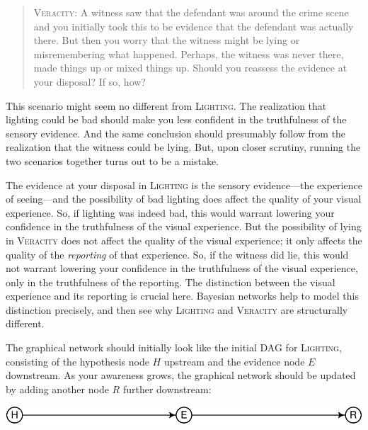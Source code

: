 \documentclass[
  11pt,
  dvipsnames,enabledeprecatedfontcommands, todos]{scrartcl}
\begin{document}
\begin{quote}
\textsc{Veracity}: A witness saw that the defendant was around the crime
scene and you initially took this to be evidence that the defendant was
actually there. But then you worry that the witness might be lying or
misremembering what happened. Perhaps, the witness was never there, made
things up or mixed things up. Should you reassess the evidence at your
disposal? If so, how?
\end{quote}

\doublespace

\noindent   This scenario might seem no different from
\textsc{Lighting}. The realization that lighting could be bad should
make you less confident in the truthfulness of the sensory evidence. And
the same conclusion should presumably follow from the realization that
the witness could be lying. But, upon closer scrutiny, running the two
scenarios together turns out to be a mistake.

The evidence at your disposal in \textsc{Lighting} is the sensory
evidence---the experience of seeing---and the possibility of bad
lighting does affect the quality of your visual experience. So, if
lighting was indeed bad, this would warrant lowering your confidence in
the truthfulness of the visual experience. But the possibility of lying
in \textsc{Veracity} does not affect the quality of the visual
experience; it only affects the quality of the \textit{reporting} of
that experience. So, if the witness did lie, this would not warrant
lowering your confidence in the truthfulness of the visual experience,
only in the truthfulness of the reporting. The distinction between the
visual experience and its reporting is crucial here. Bayesian networks
help to model this distinction precisely, and then see why
\textsc{Lighting} and \textsc{Veracity} are structurally different.

The graphical network should initially look like the initial DAG for
\textsc{Lighting}, consisting of the hypothesis node \(H\) upstream and
the evidence node \(E\) downstream. As your awareness grows, the
graphical network should be updated by adding another node \(R\) further
downstream:

\begin{center}\includegraphics[width=0.5\linewidth,height=0.3\textheight]{ReplyToSteeleStefansson5_files/figure-latex/veracityDAG-1} \end{center}
\end{document}
